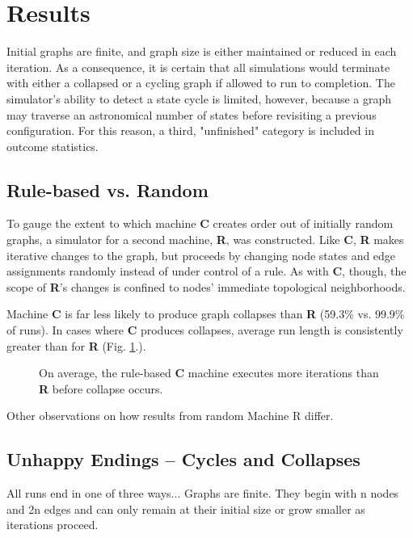 \documentclass[twoside,twocolumn]{article}
\begin{document}
\section{Results}

Initial graphs are finite, and graph size is either maintained
or reduced in each iteration. As a consequence, it is certain that all
simulations
would terminate with either a collapsed or a cycling graph if allowed to
run to completion. The simulator's ability to detect a state cycle is
limited, however, because a graph may traverse an astronomical
number of states before revisiting a previous configuration.
For this reason, a third, "unfinished" category is included in
outcome statistics.

\subsection{Rule-based vs. Random}

To gauge the extent to which machine \textbf{C} creates order out of
initially random graphs, a simulator for a second machine, \textbf{R},
was constructed. Like \textbf{C}, \textbf{R} makes iterative changes to the
graph, but proceeds by changing node states and edge assignments randomly
instead of under control of a rule. As with \textbf{C}, though, the scope
of \textbf{R}'s changes is confined to nodes' immediate topological neighborhoods.

Machine \textbf{C} is far less likely to produce graph collapses than
\textbf{R} (59.3\% vs. 99.9\% of runs). In cases where \textbf{C} produces
collapses, average run length is consistently greater than
for \textbf{R} (Fig. \ref{fig:fig1}.).

\begin{figure}
  \caption{On average, the rule-based \textbf{C} machine executes more iterations than \textbf{R}  before collapse occurs.}
  \label{fig:fig1}
\end{figure}

Other observations on how results from random Machine R differ.

\subsection{Unhappy Endings -- Cycles and Collapses}

All runs end in one of three ways... Graphs are finite. They begin
with n nodes and 2n edges and can only remain at their initial
size or grow smaller as iterations proceed.
\end{document}

